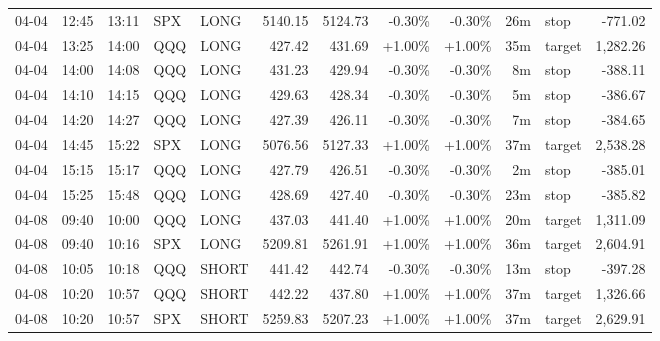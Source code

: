\documentclass[11pt,a4paper,twoside]{article}
\begin{document}
\begin{center}
\begin{longtable}{>{\color{txtmain}}l l l l l r r r r r >{\color{txtmain}}l r}
04-04 & 12:45 & 13:11 & SPX & LONG & 5140.15 & 5124.73 & \textcolor{lossred}{-0.30\%} & \textcolor{lossred}{-0.30\%} & 26m & stop & \textcolor{lossred}{-771.02} \\
04-04 & 13:25 & 14:00 & QQQ & LONG & 427.42 & 431.69 & \textcolor{wingreen}{+1.00\%} & \textcolor{wingreen}{+1.00\%} & 35m & target & \textcolor{wingreen}{1,282.26} \\
04-04 & 14:00 & 14:08 & QQQ & LONG & 431.23 & 429.94 & \textcolor{lossred}{-0.30\%} & \textcolor{lossred}{-0.30\%} & 8m & stop & \textcolor{lossred}{-388.11} \\
04-04 & 14:10 & 14:15 & QQQ & LONG & 429.63 & 428.34 & \textcolor{lossred}{-0.30\%} & \textcolor{lossred}{-0.30\%} & 5m & stop & \textcolor{lossred}{-386.67} \\
04-04 & 14:20 & 14:27 & QQQ & LONG & 427.39 & 426.11 & \textcolor{lossred}{-0.30\%} & \textcolor{lossred}{-0.30\%} & 7m & stop & \textcolor{lossred}{-384.65} \\
04-04 & 14:45 & 15:22 & SPX & LONG & 5076.56 & 5127.33 & \textcolor{wingreen}{+1.00\%} & \textcolor{wingreen}{+1.00\%} & 37m & target & \textcolor{wingreen}{2,538.28} \\
04-04 & 15:15 & 15:17 & QQQ & LONG & 427.79 & 426.51 & \textcolor{lossred}{-0.30\%} & \textcolor{lossred}{-0.30\%} & 2m & stop & \textcolor{lossred}{-385.01} \\
04-04 & 15:25 & 15:48 & QQQ & LONG & 428.69 & 427.40 & \textcolor{lossred}{-0.30\%} & \textcolor{lossred}{-0.30\%} & 23m & stop & \textcolor{lossred}{-385.82} \\
04-08 & 09:40 & 10:00 & QQQ & LONG & 437.03 & 441.40 & \textcolor{wingreen}{+1.00\%} & \textcolor{wingreen}{+1.00\%} & 20m & target & \textcolor{wingreen}{1,311.09} \\
04-08 & 09:40 & 10:16 & SPX & LONG & 5209.81 & 5261.91 & \textcolor{wingreen}{+1.00\%} & \textcolor{wingreen}{+1.00\%} & 36m & target & \textcolor{wingreen}{2,604.91} \\
04-08 & 10:05 & 10:18 & QQQ & SHORT & 441.42 & 442.74 & \textcolor{lossred}{-0.30\%} & \textcolor{lossred}{-0.30\%} & 13m & stop & \textcolor{lossred}{-397.28} \\
04-08 & 10:20 & 10:57 & QQQ & SHORT & 442.22 & 437.80 & \textcolor{wingreen}{+1.00\%} & \textcolor{wingreen}{+1.00\%} & 37m & target & \textcolor{wingreen}{1,326.66} \\
04-08 & 10:20 & 10:57 & SPX & SHORT & 5259.83 & 5207.23 & \textcolor{wingreen}{+1.00\%} & \textcolor{wingreen}{+1.00\%} & 37m & target & \textcolor{wingreen}{2,629.91} \\

\end{longtable}
\end{center}
\end{document}
